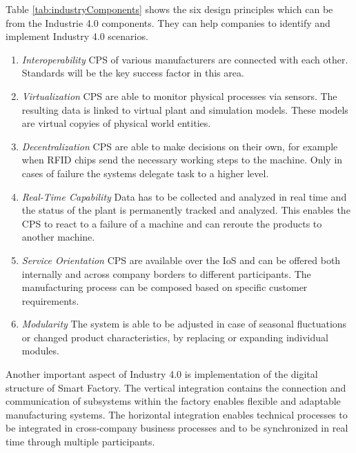 Table \ref{tab:industryComponents} shows the six design principles which can be from the Industrie 4.0 components.
They can help companies to identify and implement Industry 4.0 scenarios.\cite[p. 11]{Her2015}

\begin{enumerate}
  \item \textit{Interoperability} \ac{CPS} of various manufacturers are connected with each other. Standards will be the key success factor in this area.\cite[p. 11]{Her2015}
  \item \textit{Virtualization} \ac{CPS} are able to monitor physical processes via sensors. The resulting data is linked to virtual plant and simulation models. These models are virtual copyies of physical world entities.\cite[p. 11]{Her2015}
  \item \textit{Decentralization} \ac{CPS} are able to make decisions on their own, for example when \ac{RFID} chips send the necessary working steps to the machine. Only in cases of failure the systems delegate task to a higher level.\cite[p. 11]{Her2015}
  \item \textit{Real-Time Capability} Data has to be collected and analyzed in real time and the status of the plant is permanently tracked and analyzed. This enables the \ac{CPS} to react to a failure of a machine and can reroute the products to another machine.\cite[p. 11]{Her2015}
  \item \textit{Service Orientation} \ac{CPS} are available over the \ac{IoS} and can be offered both internally and across company borders to different participants. The manufacturing process can be composed based on specific customer requirements.\cite[p. 11]{Her2015}
  \item \textit{Modularity} The system is able to be adjusted in case of seasonal fluctuations or changed product characteristics, by replacing or expanding individual modules.\cite[p. 11]{Her2015}
\end{enumerate}


Another important aspect of Industry 4.0 is implementation of the digital structure of Smart Factory.
The vertical integration contains the connection and communication of subsystems within the factory enables flexible and adaptable manufacturing systems.\cite[p. 7 ff.]{Vbw2014}
The horizontal integration enables technical processes to be integrated in cross-company business processes and to be synchronized in real time through multiple participants.\cite[p. 7 ff.]{Vbw2014}


